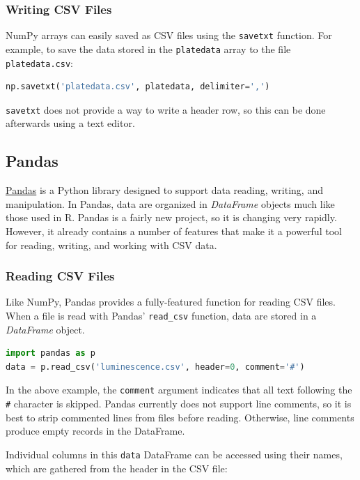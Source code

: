 \subsubsection{Writing CSV Files}

NumPy arrays can easily saved as CSV files using the \lstinline!savetxt!
function. For example, to save the data stored in the
\lstinline!platedata! array to the file \lstinline!platedata.csv!:

\begin{lstlisting}[language=Python]
np.savetxt('platedata.csv', platedata, delimiter=',')
\end{lstlisting}
\lstinline!savetxt! does not provide a way to write a header row, so
this can be done afterwards using a text editor.

\subsection{Pandas}

\href{http://pandas.pydata.org}{Pandas} is a Python library designed to
support data reading, writing, and manipulation. In Pandas, data are
organized in \emph{DataFrame} objects much like those used in R. Pandas
is a fairly new project, so it is changing very rapidly. However, it
already contains a number of features that make it a powerful tool for
reading, writing, and working with CSV data.

\subsubsection{Reading CSV Files}

Like NumPy, Pandas provides a fully-featured function for reading CSV
files. When a file is read with Pandas' \lstinline!read_csv! function,
data are stored in a \emph{DataFrame} object.

\begin{lstlisting}[language=Python]
import pandas as p
data = p.read_csv('luminescence.csv', header=0, comment='#')
\end{lstlisting}
In the above example, the \lstinline!comment! argument indicates that
all text following the \lstinline!#! character is skipped. Pandas
currently does not support line comments, so it is best to strip
commented lines from files before reading. Otherwise, line comments
produce empty records in the DataFrame.

Individual columns in this \lstinline!data! DataFrame can be accessed
using their names, which are gathered from the header in the CSV file:

